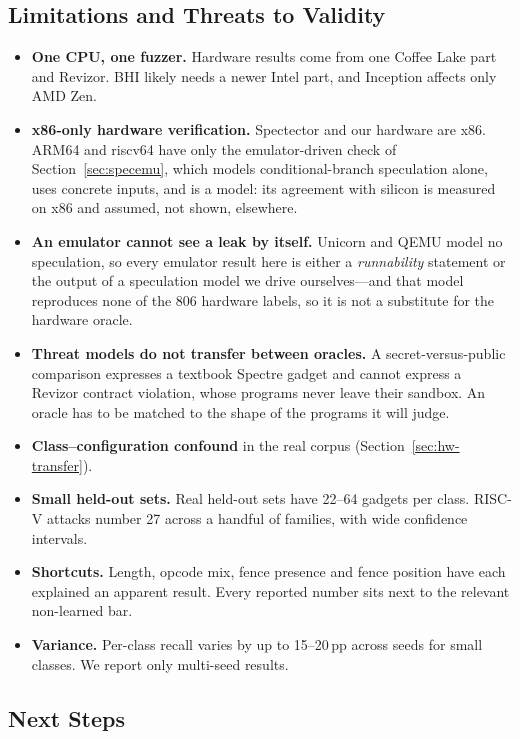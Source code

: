 \documentclass[conference]{IEEEtran}
\begin{document}
\subsection{Limitations and Threats to Validity}
\label{sec:limits}
\begin{itemize}[itemsep=1pt,leftmargin=1.2em]
  \item \textbf{One CPU, one fuzzer.} Hardware results come from one Coffee
    Lake part and Revizor. BHI likely needs a newer Intel part, and
    Inception affects only AMD Zen.
  \item \textbf{x86-only hardware verification.} Spectector and our hardware
    are x86. ARM64 and riscv64 have only the emulator-driven check of
    Section~\ref{sec:specemu}, which models conditional-branch speculation
    alone, uses concrete inputs, and is a model: its agreement with silicon is
    measured on x86 and assumed, not shown, elsewhere.
  \item \textbf{An emulator cannot see a leak by itself.} Unicorn and QEMU
    model no speculation, so every emulator result here is either a
    \emph{runnability} statement or the output of a speculation model we drive
    ourselves---and that model reproduces none of the 806 hardware labels, so
    it is not a substitute for the hardware oracle.
  \item \textbf{Threat models do not transfer between oracles.} A
    secret-versus-public comparison expresses a textbook Spectre gadget and
    cannot express a Revizor contract violation, whose programs never leave
    their sandbox. An oracle has to be matched to the shape of the programs it
    will judge.
  \item \textbf{Class--configuration confound} in the real corpus
    (Section~\ref{sec:hw-transfer}).
  \item \textbf{Small held-out sets.} Real held-out sets have 22--64 gadgets
    per class. RISC-V attacks number 27 across a handful of families, with
    wide confidence intervals.
  \item \textbf{Shortcuts.} Length, opcode mix, fence presence and fence
    position have each explained an apparent result. Every reported number
    sits next to the relevant non-learned bar.
  \item \textbf{Variance.} Per-class recall varies by up to 15--20\,pp across
    seeds for small classes. We report only multi-seed results.
\end{itemize}

\subsection{Next Steps}
\label{sec:future}
\end{document}
